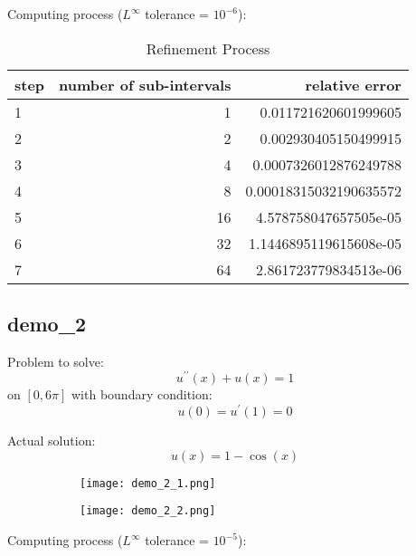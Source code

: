 \documentclass{article}
\begin{document}
Computing process ($L^\infty$ tolerance = $10^{-6}$):

\begin{table}[H]
    \centering
    \begin{tabular}{l|r|r}
        step & number of sub-intervals & relative error \\
        \hline
        1  &  1 & 0.011721620601999605 \\
        2  &  2 & 0.002930405150499915 \\
        3  &  4 & 0.0007326012876249788 \\
        4  &  8 & 0.00018315032190635572 \\
        5  & 16 & 4.578758047657505e-05 \\
        6  & 32 & 1.1446895119615608e-05 \\
        7  & 64 & 2.861723779834513e-06 \\
    \end{tabular}
    \caption{Refinement Process}
\end{table}


\subsection{demo\_2}

Problem to solve:
$$
    u^{\prime\prime}(x) + u(x) = 1
$$ on $[0, 6\pi]$
with boundary condition:
$$
    u(0) = u^\prime(1) = 0
$$

Actual solution:
$$
    u(x) = 1 - \cos(x)
$$

\begin{figure}[H]
	\centering
	\begin{subfigure}[h]{0.45\linewidth}
	    \texttt{[image: demo\_2\_1.png]}
    \end{subfigure}
    \begin{subfigure}[h]{0.45\linewidth}
	    \texttt{[image: demo\_2\_2.png]}
    \end{subfigure}
\end{figure}

Computing process ($L^\infty$ tolerance = $10^{-5}$):
\end{document}
